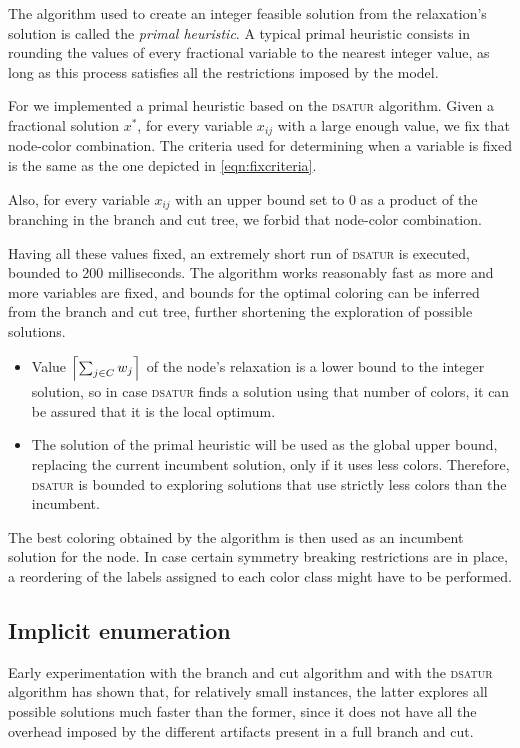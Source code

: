 The algorithm used to create an integer feasible solution from the relaxation's solution is called the \textit{primal heuristic}. A typical primal heuristic consists in rounding the values of every fractional variable to the nearest integer value, as long as this process satisfies all the restrictions imposed by the model.

For \PCP{} we implemented a primal heuristic based on the \textsc{dsatur} algorithm. Given a fractional solution $x^*$, for every variable $x_{ij}$ with a large enough value, we fix that node-color combination. The criteria used for determining when a variable is fixed is the same as the one depicted in \ref{eqn:fixcriteria}.

Also, for every variable $x_{ij}$ with an upper bound set to $0$ as a product of the branching in the branch and cut tree, we forbid that node-color combination.

Having all these values fixed, an extremely short run of \textsc{dsatur} is executed, bounded to 200 milliseconds. The algorithm works reasonably fast as more and more variables are fixed, and bounds for the optimal coloring can be inferred from the branch and cut tree, further shortening the exploration of possible solutions. 
\begin{itemize}
\item{Value $\left\lceil \sum_{j \in C} w_j \right\rceil$ of the node's relaxation is a lower bound to the integer solution, so in case \textsc{dsatur} finds a solution using that number of colors, it can be assured that it is the local optimum.}
\item{The solution of the primal heuristic will be used as the global upper bound, replacing the current incumbent solution, only if it uses less colors. Therefore, \textsc{dsatur} is bounded to exploring solutions that use strictly less colors than the incumbent.}
\end{itemize}

The best coloring obtained by the algorithm is then used as an incumbent solution for the node. In case certain symmetry breaking restrictions are in place, a reordering of the labels assigned to each color class might have to be performed.

\subsection{Implicit enumeration}
\label{subsec:alg:implicit}

Early experimentation with the branch and cut algorithm and with the \textsc{dsatur} algorithm has shown that, for relatively small instances, the latter explores all possible solutions much faster than the former, since it does not have all the overhead imposed by the different artifacts present in a full branch and cut.

